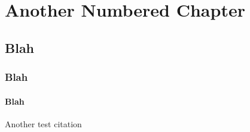 \chapter{Another Numbered Chapter}
\section{Blah}
\subsection{Blah}
\subsubsection{Blah}
Another test citation~\cite{eatonconventionalfirepanel}
